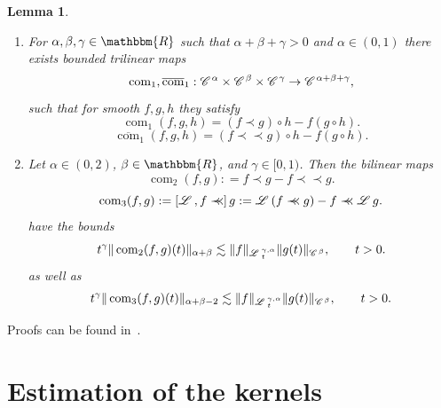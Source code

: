 \documentclass[a4paper,11pt]{article}
\newcommand{\assign}{:=}
\newcommand{\precprec}{\prec\!\!\!\prec}
\newcommand{\tmdummy}{$\mbox{}$}
\newcommand{\tmop}[1]{\ensuremath{\operatorname{#1}}}
\newenvironment{enumeratealpha}{\begin{enumerate}[a{\textup{)}}] }{\end{enumerate}}
\newtheorem{lemma}[theorem]{Lemma}
{\theorembodyfont{\rmfamily}\newtheorem{remark}[theorem]{Remark}}
\newcommand{\CC}{\mathscr{C} \hspace{.1em}}
\newcommand{\LL}{\mathscr{L} \hspace{.2em}}
\begin{document}
\begin{lemma}
  \label{lem:all-commutators}{\tmdummy}
  
  \begin{enumeratealpha}
    \item For $\alpha, \beta, \gamma \in \mathbbm{R}$ such that $\alpha +
    \beta + \gamma > 0$ and $\alpha \in (0, 1)$ there exists bounded trilinear
    maps
    \[ \tmop{com}_1, \overline{\tmop{com}}_1 : \CC^{\alpha} \times
       \CC^{\beta} \times \CC^{\gamma} \rightarrow \CC^{\alpha + \beta +
       \gamma}, \]
    such that for smooth $f, g, h$ they satisfy
    \begin{equation}
      \tmop{com}_1 (f, g, h) = (f \prec g) \circ h - f (g \circ h) .
      \label{e:firstcomm-nonsmooth}
    \end{equation}
    \begin{equation}
      \overline{\tmop{com}}_1 (f, g, h) = (f \precprec g) \circ h - f (g \circ
      h) . \label{e:firstcomm}
    \end{equation}
    \item Let $\alpha \in (0, 2)$, $\beta \in \mathbbm{R}$, and $\gamma \in
    [0, 1)$. Then the bilinear maps
    \begin{equation}
      \tmop{com}_2 (f, g) : = f \prec g - f \precprec g. \label{e:secondcomm}
    \end{equation}
    \begin{equation}
      \tmop{com}_3 (f, g) : = \left[ \LL, f \precprec \right] g \assign \LL (f
      \precprec g) - f \precprec \LL g. \label{e:thirdcomm}
    \end{equation}
    have the bounds
    \begin{equation}
      t^{\gamma} \| \tmop{com}_2 (f, g) (t) \|_{\alpha + \beta} \lesssim \| f
      \|_{\LL^{\gamma, \alpha}_t} \| g (t) \|_{\CC^{\beta}}, \qquad t > 0.
      \label{eq:bound-second-comm}
    \end{equation}
    as well as
    \begin{equation}
      t^{\gamma} \| \tmop{com}_3 (f, g) (t) \|_{\alpha + \beta - 2} \lesssim
      \| f \|_{\LL^{\gamma, \alpha}_t} \| g (t) \|_{\CC^{\beta}}, \qquad t >
      0. \label{eq:bound-third-comm}
    \end{equation}
  \end{enumeratealpha}
\end{lemma}

Proofs can be found in~{\cite{gubinelli_kpz_2017}}.

\section{\label{a:ker-est}Estimation of the kernels}
\end{document}
